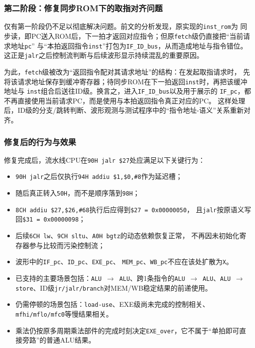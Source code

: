 ﻿\documentclass{article}
\begin{document}
\subsubsection{第二阶段：修复同步ROM下的取指对齐问题}

仅有第一阶段仍不足以彻底解决问题。前文的分析发现，原实现的\texttt{inst\_rom}为
同步读，即PC送入ROM后，下一拍才返回对应指令；但原\texttt{fetch}级仍直接把“当前请求地址\texttt{pc}”
与“本拍返回指令\texttt{inst}”打包为\texttt{IF\_ID\_bus}，从而造成地址与指令错位。
这正是\texttt{jalr}之后控制流判断与后续波形显示持续混乱的重要原因。

为此，\texttt{fetch}级被改为“返回指令配对其请求地址”的结构：在发起取指请求时，
先将该请求地址保存到缓冲寄存器；待同步ROM在下一拍返回\texttt{inst}时，再把该缓冲地址与
\texttt{inst}组合后送往ID级。换言之，进入\texttt{IF\_ID\_bus}以及用于展示的
\texttt{IF\_pc}，都不再直接使用当前请求PC，而是使用与本拍返回指令真正对应的PC。
这样处理后，ID级的分支/跳转判断、波形观测与测试程序中的“指令地址-语义”关系重新对齐。

\subsubsection{修复后的行为与效果}

修复完成后，流水线CPU在\texttt{90H jalr \$27}处应满足以下关键行为：
\begin{itemize}
  \item \texttt{90H jalr}之后仅执行\texttt{94H addiu \$1,\$0,\#8}作为延迟槽；
  \item 随后真正转入\texttt{50H}，而不是顺序落到\texttt{98H}；
  \item \texttt{8CH addiu \$27,\$26,\#68}执行后应得到\texttt{\$27 = 0x00000050}，
  且\texttt{jalr}按原语义写回\texttt{\$31 = 0x00000098}；
  \item 后续\texttt{6CH lw}、\texttt{9CH sltu}、\texttt{A0H bgtz}的动态依赖恢复正常，
  不再因未初始化寄存器参与比较而污染控制流；
  \item 波形中的\texttt{IF\_pc}、\texttt{ID\_pc}、\texttt{EXE\_pc}、
  \texttt{MEM\_pc}、\texttt{WB\_pc}不应在该处扩散为\texttt{X}。
\end{itemize}

\begin{itemize}
  \item 已支持的主要场景包括：\texttt{ALU $\rightarrow$ ALU}、跨1条指令的\texttt{ALU $\rightarrow$ ALU}、\texttt{ALU $\rightarrow$ store}、ID级\texttt{jr/jalr/branch}对MEM/WB稳定结果的前递使用。
  \item 仍需停顿的场景包括：\texttt{load-use}、EXE级尚未完成的控制相关、\texttt{mfhi/mflo/mfc0}等慢结果相关。
  \item 乘法仍按原多周期乘法部件的完成时刻决定\texttt{EXE\_over}，它不属于“单拍即可直接旁路”的普通ALU结果。
\end{itemize}
\end{document}
